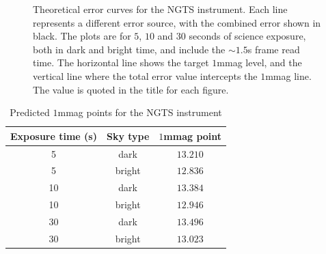 \documentclass[11pt,a4paper]{report}
\begin{document}
\begin{figure}[p]
  \caption{Theoretical error curves for the NGTS instrument. Each line represents a different
  error source, with the combined error shown in black. The plots are
  for $5$, $10$ and $30$ seconds of science exposure, both in dark and
  bright time, and include the
  $\sim 1.5$s frame read time. The horizontal
  line shows the target $1$mmag level, and the vertical line where the
  total error value intercepts the $1$mmag line. The value is quoted in
  the title for each figure.}
  \label{fig:rmsmagplots}
\end{figure}

\begin{table}[h]
    \centering
    \begin{tabular}{ccc}
        \toprule
        Exposure time (s) & Sky type & $1$mmag point \\
        \midrule
        5 & dark & $13.210$ \\
        5 & bright & $12.836$ \\
        10 & dark & $13.384$ \\
        10 & bright & $12.946$ \\
        30 & dark & $13.496$ \\
        30 & bright & $13.023$ \\
        \bottomrule
    \end{tabular}
    \caption{Predicted $1$mmag points for the NGTS instrument}
    \label{tab:1mmagpoints}
\end{table}
\end{document}
